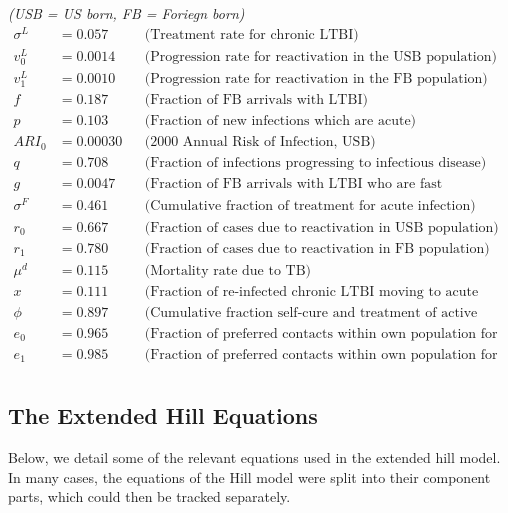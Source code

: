 \documentclass{amsart}
\begin{document}
\textit{(USB = US born, FB = Foriegn born)}
\begin{align*}
  \sigma^{L} &= 0.057   &&\text{(Treatment rate for chronic LTBI)}\\
  v^{L}_{0}  &= 0.0014  &&\text{(Progression rate for reactivation in the USB
                                 population)}\\
  v^{L}_{1}  &= 0.0010  &&\text{(Progression rate for reactivation in the FB
                                 population)}\\
  f          &= 0.187   &&\text{(Fraction of FB arrivals with LTBI)}\\
  p          &= 0.103   &&\text{(Fraction of new infections which are acute)}\\
  ARI_{0}    &= 0.00030 &&\text{(2000 Annual Risk of Infection, USB)}\\
  q          &= 0.708   &&\text{(Fraction of infections progressing to infectious
                                 disease)}\\
  g          &= 0.0047  &&\text{(Fraction of FB arrivals with LTBI who are fast
                                 progressors)}\\
  \sigma^{F} &= 0.461   &&\text{(Cumulative fraction of treatment for acute
                                 infection)}\\
  r_{0}      &= 0.667   &&\text{(Fraction of cases due to reactivation in USB
                                 population)}\\
  r_{1}      &= 0.780   &&\text{(Fraction of cases due to reactivation in FB
                                 population)}\\
  \mu^{d}    &= 0.115   &&\text{(Mortality rate due to TB)}\\
  x          &= 0.111   &&\text{(Fraction of re-infected chronic LTBI moving to
                                 acute infection)}\\
  \phi       &= 0.897   &&\text{(Cumulative fraction self-cure and treatment of
                                 active disease)}\\
  e_{0}      &= 0.965   &&\text{(Fraction of preferred contacts within own
                                 population for USB)}\\
  e_{1}      &= 0.985   &&\text{(Fraction of preferred contacts within own
                                population for FB)}\\
\end{align*}
\subsection{The Extended Hill Equations}
\label{sec:extendedHillEqs}
Below, we detail some of the relevant equations used in the extended hill model.
In many cases, the equations of the Hill model were split into their component
parts, which could then be tracked separately. 
\end{document}

